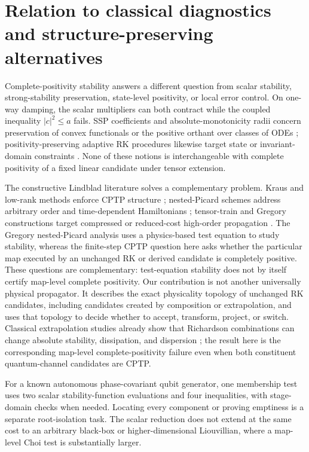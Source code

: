\section{Relation to classical diagnostics and structure-preserving alternatives}
\label{sec:comparison}

Complete-positivity stability answers a different question from scalar stability, strong-stability preservation, state-level positivity, or local error control. On one-way damping, the scalar multipliers can both contract while the coupled inequality $|c|^2\le a$ fails. SSP coefficients and absolute-monotonicity radii concern preservation of convex functionals or the positive orthant over classes of ODEs \cite{Kraaijevanger1986Absolute,Kraaijevanger1991Contractivity,GottliebShuTadmor2001,FerracinaSpijker2004,Higueras2005}; positivity-preserving adaptive RK procedures likewise target state or invariant-domain constraints \cite{NussleinRanochaKetcheson2021}. None of these notions is interchangeable with complete positivity of a fixed linear candidate under tensor extension.

The constructive Lindblad literature solves a complementary problem. Kraus and low-rank methods enforce CPTP structure \cite{CaoLu2025,AppeloCheng2025}; nested-Picard schemes address arbitrary order and time-dependent Hamiltonians \cite{HuAppeloCheng2025NPI}; tensor-train and Gregory constructions target compressed or reduced-cost high-order propagation \cite{DelMastroAppeloCheng2026TT,HuAppeloCheng2026Gregory}. The Gregory nested-Picard analysis uses a physics-based test equation to study stability, whereas the finite-step CPTP question here asks whether the particular map executed by an unchanged RK or derived candidate is completely positive. These questions are complementary: test-equation stability does not by itself certify map-level complete positivity. Our contribution is not another universally physical propagator. It describes the exact physicality topology of unchanged RK candidates, including candidates created by composition or extrapolation, and uses that topology to decide whether to accept, transform, project, or switch. Classical extrapolation studies already show that Richardson combinations can change absolute stability, dissipation, and dispersion \cite{Szyszkowicz1985Richardson,ZlatevEtAl2017Richardson,HavasiKazemi2018Richardson}; the result here is the corresponding map-level complete-positivity failure even when both constituent quantum-channel candidates are CPTP.

For a known autonomous phase-covariant qubit generator, one membership test uses two scalar stability-function evaluations and four inequalities, with stage-domain checks when needed. Locating every component or proving emptiness is a separate root-isolation task. The scalar reduction does not extend at the same cost to an arbitrary black-box or higher-dimensional Liouvillian, where a map-level Choi test is substantially larger.

